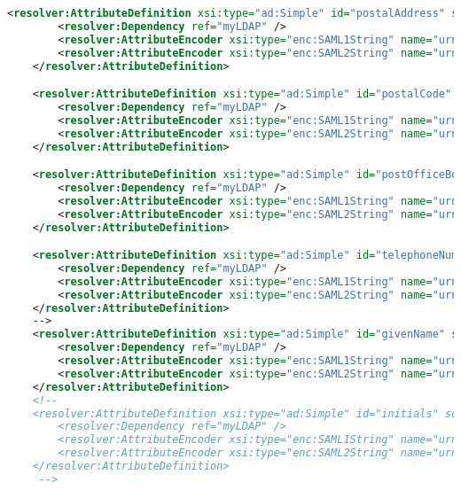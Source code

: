 \begin{lstlisting}[language=xml]
    <resolver:AttributeDefinition xsi:type="ad:Simple" id="postalAddress" sourceAttributeID="postalAddress">
        <resolver:Dependency ref="myLDAP" />
        <resolver:AttributeEncoder xsi:type="enc:SAML1String" name="urn:mace:dir:attribute-def:postalAddress" />
        <resolver:AttributeEncoder xsi:type="enc:SAML2String" name="urn:oid:2.5.4.16" friendlyName="postalAddress" />
    </resolver:AttributeDefinition>

    <resolver:AttributeDefinition xsi:type="ad:Simple" id="postalCode" sourceAttributeID="postalCode">
        <resolver:Dependency ref="myLDAP" />
        <resolver:AttributeEncoder xsi:type="enc:SAML1String" name="urn:mace:dir:attribute-def:postalCode" />
        <resolver:AttributeEncoder xsi:type="enc:SAML2String" name="urn:oid:2.5.4.17" friendlyName="postalCode" />
    </resolver:AttributeDefinition>

    <resolver:AttributeDefinition xsi:type="ad:Simple" id="postOfficeBox" sourceAttributeID="postOfficeBox">
        <resolver:Dependency ref="myLDAP" />
        <resolver:AttributeEncoder xsi:type="enc:SAML1String" name="urn:mace:dir:attribute-def:postOfficeBox" />
        <resolver:AttributeEncoder xsi:type="enc:SAML2String" name="urn:oid:2.5.4.18" friendlyName="postOfficeBox" />
    </resolver:AttributeDefinition>

    <resolver:AttributeDefinition xsi:type="ad:Simple" id="telephoneNumber" sourceAttributeID="telephoneNumber">
        <resolver:Dependency ref="myLDAP" />
        <resolver:AttributeEncoder xsi:type="enc:SAML1String" name="urn:mace:dir:attribute-def:telephoneNumber" />
        <resolver:AttributeEncoder xsi:type="enc:SAML2String" name="urn:oid:2.5.4.20" friendlyName="telephoneNumber" />
    </resolver:AttributeDefinition>
    -->
    <resolver:AttributeDefinition xsi:type="ad:Simple" id="givenName" sourceAttributeID="givenName">
        <resolver:Dependency ref="myLDAP" />
        <resolver:AttributeEncoder xsi:type="enc:SAML1String" name="urn:mace:dir:attribute-def:givenName" />
        <resolver:AttributeEncoder xsi:type="enc:SAML2String" name="urn:oid:2.5.4.42" friendlyName="givenName" />
    </resolver:AttributeDefinition>
    <!--
    <resolver:AttributeDefinition xsi:type="ad:Simple" id="initials" sourceAttributeID="initials">
        <resolver:Dependency ref="myLDAP" />
        <resolver:AttributeEncoder xsi:type="enc:SAML1String" name="urn:mace:dir:attribute-def:initials" />
        <resolver:AttributeEncoder xsi:type="enc:SAML2String" name="urn:oid:2.5.4.43" friendlyName="initials" />
    </resolver:AttributeDefinition>
     -->


\end{lstlisting}

